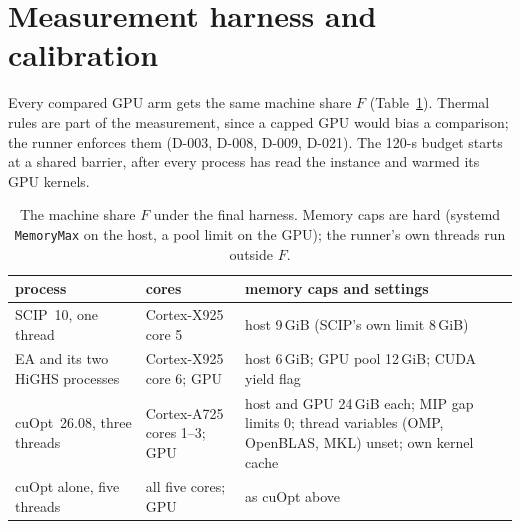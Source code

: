 \section{Measurement harness and calibration}\label{app:harness}
Every compared GPU arm gets the same machine share $F$ (Table~\ref{tab:footprint}). Thermal rules are part of the
measurement, since a capped GPU would bias a comparison; the runner enforces them (D-003, D-008, D-009, D-021). The
120-s budget starts at a shared barrier, after every process has read the instance and warmed its GPU kernels.

\begin{table}[!tb]\centering\scriptsize
\caption{The machine share $F$ under the final harness. Memory caps are hard (systemd \texttt{MemoryMax} on the
host, a pool limit on the GPU); the runner's own threads run outside $F$.}\label{tab:footprint}
\setlength{\tabcolsep}{3pt}
\begin{tabular}{>{\raggedright}p{4.3cm}>{\raggedright}p{3.6cm}>{\raggedright\arraybackslash}p{7.6cm}}
\toprule
process & cores & memory caps and settings \\
\midrule
SCIP~10, one thread & Cortex-X925 core 5 & host 9\,GiB (SCIP's own limit 8\,GiB) \\
EA and its two HiGHS processes & Cortex-X925 core 6; GPU & host 6\,GiB; GPU pool 12\,GiB; CUDA yield flag \\
cuOpt~26.08, three threads & Cortex-A725 cores 1--3; GPU & host and GPU 24\,GiB each; MIP gap limits 0; thread
  variables (OMP, OpenBLAS, MKL) unset; own kernel cache \\
cuOpt alone, five threads & all five cores; GPU & as cuOpt above \\
\bottomrule
\end{tabular}
\end{table}

